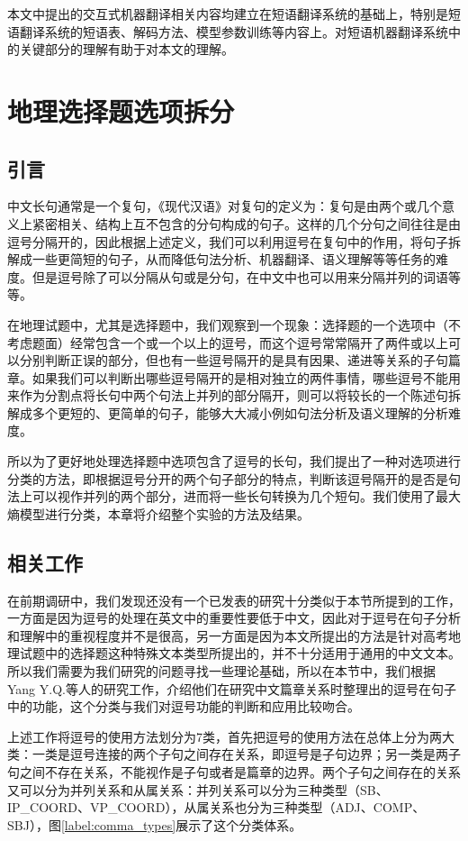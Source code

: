 \documentclass[master, winfont]{njuthesis}
\begin{document}
本文中提出的交互式机器翻译相关内容均建立在短语翻译系统的基础上，特别是短语翻译系统的短语表、解码方法、模型参数训练等内容上。对短语机器翻译系统中的关键部分的理解有助于对本文的理解。

\chapter{地理选择题选项拆分}
\label{chapter:split}
\section{引言}
中文长句通常是一个复句，《现代汉语》对复句的定义为：复句是由两个或几个意义上紧密相关、结构上互不包含的分句构成的句子\cite{zhou2008}。这样的几个分句之间往往是由逗号分隔开的，因此根据上述定义，我们可以利用逗号在复句中的作用，将句子拆解成一些更简短的句子，从而降低句法分析、机器翻译、语义理解等等任务的难度。但是逗号除了可以分隔从句或是分句，在中文中也可以用来分隔并列的词语等等。

在地理试题中，尤其是选择题中，我们观察到一个现象：选择题的一个选项中（不考虑题面）经常包含一个或一个以上的逗号，而这个逗号常常隔开了两件或以上可以分别判断正误的部分，但也有一些逗号隔开的是具有因果、递进等关系的子句篇章。如果我们可以判断出哪些逗号隔开的是相对独立的两件事情，哪些逗号不能用来作为分割点将长句中两个句法上并列的部分隔开，则可以将较长的一个陈述句拆解成多个更短的、更简单的句子，能够大大减小例如句法分析及语义理解的分析难度。

所以为了更好地处理选择题中选项包含了逗号的长句，我们提出了一种对选项进行分类的方法，即根据逗号分开的两个句子部分的特点，判断该逗号隔开的是否是句法上可以视作并列的两个部分，进而将一些长句转换为几个短句。我们使用了最大熵模型进行分类，本章将介绍整个实验的方法及结果。

\section{相关工作}
在前期调研中，我们发现还没有一个已发表的研究十分类似于本节所提到的工作，一方面是因为逗号的处理在英文中的重要性要低于中文，因此对于逗号在句子分析和理解中的重视程度并不是很高，另一方面是因为本文所提出的方法是针对高考地理试题中的选择题这种特殊文本类型所提出的，并不十分适用于通用的中文文本。所以我们需要为我们研究的问题寻找一些理论基础，所以在本节中，我们根据Yang Y.Q.等人\cite{Yang2012Chinese}的研究工作，介绍他们在研究中文篇章关系时整理出的逗号在句子中的功能，这个分类与我们对逗号功能的判断和应用比较吻合。

上述工作将逗号的使用方法划分为7类，首先把逗号的使用方法在总体上分为两大类：一类是逗号连接的两个子句之间存在关系，即逗号是子句边界；另一类是两子句之间不存在关系，不能视作是子句或者是篇章的边界。两个子句之间存在的关系又可以分为并列关系和从属关系：并列关系可以分为三种类型（SB、IP\_COORD、VP\_COORD），从属关系也分为三种类型（ADJ、COMP、SBJ），图\ref{label:comma_types}展示了这个分类体系。
\end{document}
